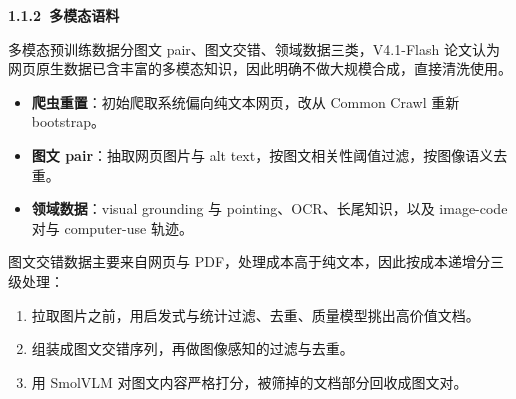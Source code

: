 \documentclass[zihao=false,fontset=windows]{ctexart}
\begin{document}
\par{}\vspace{0.8em}\noindent \begin{tcolorbox}[boxrule=0pt,arc=3pt,colback=callGreen,left=3pt,right=3pt,top=2pt,bottom=2pt,before skip=0pt,after skip=0pt]{\bfseries \textcolor{feishuBlue}{1.1.2}\ 多模态语料}\end{tcolorbox}\par\vspace{0.28em}

多模态预训练数据分图文 pair、图文交错、领域数据三类，\textcolor{feishuRed}{V4.1-Flash 论文认为网页原生数据已含丰富的多模态知识，因此明确不做大规模合成，直接清洗使用。}\par
\begin{itemize}
\item 
\textbf{爬虫重置}：初始爬取系统偏向纯文本网页，改从 Common Crawl 重新 bootstrap。\par
\item 
\textbf{图文 pair}：抽取网页图片与 alt text，按图文相关性阈值过滤，按图像语义去重。\par
\item 
\textbf{领域数据}：visual grounding 与 pointing、OCR、长尾知识，以及 image-code 对与 computer-use 轨迹。\par
\end{itemize}

图文交错数据主要来自网页与 PDF，处理成本高于纯文本，因此按成本递增分三级处理：\par
\begin{enumerate}
\item 
拉取图片之前，用启发式与统计过滤、去重、质量模型挑出高价值文档。\par
\item 
组装成图文交错序列，再做图像感知的过滤与去重。\par
\item 
用 SmolVLM 对图文内容严格打分，被筛掉的文档部分回收成图文对。\par
\end{enumerate}
\end{document}
